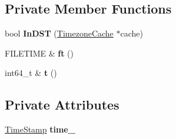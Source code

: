 \subsection*{Private Member Functions}
\begin{DoxyCompactItemize}
\item 
bool {\bfseries In\+D\+ST} (\hyperlink{classv8_1_1base_1_1_timezone_cache}{Timezone\+Cache} $\ast$cache)\hypertarget{classv8_1_1base_1_1_win32_time_af51042ade025ee206775696611044ace}{}\label{classv8_1_1base_1_1_win32_time_af51042ade025ee206775696611044ace}

\item 
F\+I\+L\+E\+T\+I\+ME \& {\bfseries ft} ()\hypertarget{classv8_1_1base_1_1_win32_time_af474260cb7f8e0e14523d1ceed0709c2}{}\label{classv8_1_1base_1_1_win32_time_af474260cb7f8e0e14523d1ceed0709c2}

\item 
int64\+\_\+t \& {\bfseries t} ()\hypertarget{classv8_1_1base_1_1_win32_time_a49be8a0d45eaa0a00413e3598e94bfe4}{}\label{classv8_1_1base_1_1_win32_time_a49be8a0d45eaa0a00413e3598e94bfe4}

\end{DoxyCompactItemize}
\subsection*{Private Attributes}
\begin{DoxyCompactItemize}
\item 
\hyperlink{unionv8_1_1base_1_1_win32_time_1_1_time_stamp}{Time\+Stamp} {\bfseries time\+\_\+}\hypertarget{classv8_1_1base_1_1_win32_time_a84ed4aaddbb963d03ee06735fc1b1731}{}\label{classv8_1_1base_1_1_win32_time_a84ed4aaddbb963d03ee06735fc1b1731}

\end{DoxyCompactItemize}

